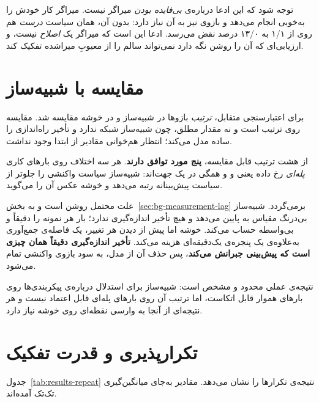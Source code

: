 توجه شود که این ادعا درباره‌ی \emph{بی‌فایده بودن} میراگر نیست. میراگر کار خودش را به‌خوبی
انجام می‌دهد و بازوی  نیز به آن نیاز دارد: بدون آن، همان سیاست \emph{درست}
هم روی  از ۱/۱ به ۱۳/۰ درصد نقض می‌رسد. ادعا این است که میراگر یک
\emph{اصلاح} نیست، و ارزیابی‌ای که آن را روشن نگه دارد نمی‌تواند سالم را از معیوبِ میراشده
تفکیک کند.

\section{مقایسه با شبیه‌ساز}
\label{sec:results-simulator}

برای اعتبارسنجی متقابل، \emph{ترتیب} بازوها در شبیه‌ساز و در خوشه مقایسه شد. مقایسه روی ترتیب
است و نه مقدار مطلق، چون شبیه‌ساز شبکه ندارد و تأخیر راه‌اندازی را ساده مدل می‌کند؛ انتظار
هم‌خوانی مقادیر از ابتدا وجود نداشت.

از هشت ترتیب قابل مقایسه، \textbf{پنج مورد توافق دارند}. هر سه اختلاف روی بارهای کاری
\emph{پله‌ای} رخ داده \mdash{} یعنی  و  \mdash{} و همگی در یک جهت‌اند: شبیه‌ساز
سیاست واکنشی را جلوتر از سیاست پیش‌بینانه رتبه می‌دهد و خوشه عکس آن را می‌گوید.

علت محتمل روشن است و به بخش~\ref{sec:bg-measurement-lag} برمی‌گردد. شبیه‌ساز بی‌درنگ مقیاس به
پایین می‌دهد و هیچ تأخیر اندازه‌گیری ندارد؛ بار هر نمونه را دقیقاً و بی‌واسطه حساب می‌کند.
خوشه اما پیش از دیدن هر تغییر، یک فاصله‌ی جمع‌آوری به‌علاوه‌ی یک پنجره‌ی یک‌دقیقه‌ای
 هزینه می‌کند. \textbf{تأخیر اندازه‌گیری دقیقاً همان چیزی است که پیش‌بینی جبرانش
می‌کند}، پس حذف آن از مدل، به سود بازوی واکنشی تمام می‌شود.

نتیجه‌ی عملی محدود و مشخص است: شبیه‌ساز برای استدلال درباره‌ی پیکربندی‌ها روی بارهای هموار
قابل اتکاست، اما ترتیب آن روی بارهای پله‌ای قابل اعتماد نیست و هر نتیجه‌ای از آنجا به وارسی
نقطه‌ای روی خوشه نیاز دارد.

\section{تکرارپذیری و قدرت تفکیک}
\label{sec:results-repeatability}

جدول~\ref{tab:results-repeat} نتیجه‌ی تکرارها را نشان می‌دهد. مقادیر به‌جای میانگین‌گیری
تک‌تک آمده‌اند.

